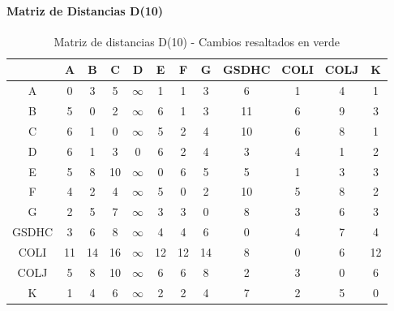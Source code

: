 \documentclass[12pt]{article}
\begin{document}
\paragraph{Matriz de Distancias D(10)}
\begin{table}[h!]
\centering
\begin{tabular}{|c|c|c|c|c|c|c|c|c|c|c|c|}
\hline
 & A & B & C & D & E & F & G & GSDHC & COLI & COLJ & K \\\hline
A & 0 & 3 & 5 & $\infty$ & 1 & 1 & 3 & \cellcolor{lightgreen} 6 & 1 & 4 & 1 \\\hline
B & 5 & 0 & 2 & $\infty$ & 6 & 1 & 3 & \cellcolor{lightgreen} 11 & 6 & 9 & 3 \\\hline
C & 6 & 1 & 0 & $\infty$ & 5 & 2 & 4 & \cellcolor{lightgreen} 10 & 6 & 8 & 1 \\\hline
D & 6 & 1 & 3 & 0 & 6 & 2 & 4 & \cellcolor{lightgreen} 3 & \cellcolor{lightgreen} 4 & 1 & 2 \\\hline
E & 5 & 8 & 10 & $\infty$ & 0 & 6 & 5 & \cellcolor{lightgreen} 5 & 1 & 3 & 3 \\\hline
F & 4 & 2 & 4 & $\infty$ & 5 & 0 & 2 & \cellcolor{lightgreen} 10 & 5 & 8 & 2 \\\hline
G & 2 & 5 & 7 & $\infty$ & 3 & 3 & 0 & \cellcolor{lightgreen} 8 & 3 & 6 & 3 \\\hline
GSDHC & 3 & 6 & 8 & $\infty$ & 4 & 4 & 6 & 0 & 4 & 7 & 4 \\\hline
COLI & \cellcolor{lightgreen} 11 & \cellcolor{lightgreen} 14 & \cellcolor{lightgreen} 16 & $\infty$ & \cellcolor{lightgreen} 12 & \cellcolor{lightgreen} 12 & \cellcolor{lightgreen} 14 & \cellcolor{lightgreen} 8 & 0 & 6 & \cellcolor{lightgreen} 12 \\\hline
COLJ & 5 & 8 & 10 & $\infty$ & 6 & 6 & 8 & 2 & 3 & 0 & 6 \\\hline
K & 1 & 4 & 6 & $\infty$ & 2 & 2 & 4 & \cellcolor{lightgreen} 7 & 2 & 5 & 0 \\\hline
\end{tabular}
\caption{Matriz de distancias D(10) - Cambios resaltados en verde}
\end{table}
\end{document}
